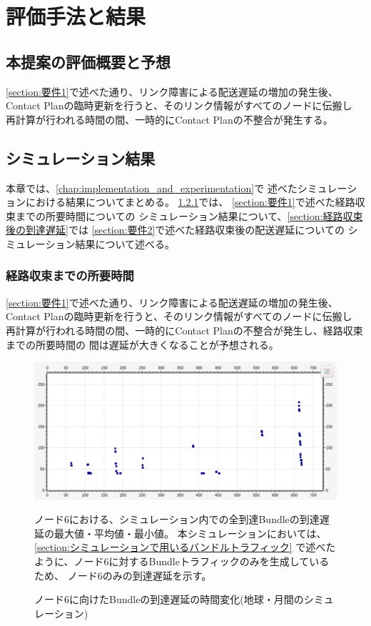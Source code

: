 \chapter{評価手法と結果}
\label{chap:evaluation}
\section{本提案の評価概要と予想}
\ref{section:要件1}で述べた通り、リンク障害による配送遅延の増加の発生後、
Contact Planの臨時更新を行うと、そのリンク情報がすべてのノードに伝搬し
再計算が行われる時間の間、一時的にContact Planの不整合が発生する。

\section{シミュレーション結果}
本章では、\ref{chap:implementation_and_experimentation}で
述べたシミュレーションにおける結果についてまとめる。
\ref{section:経路収束までの所要時間}では、
\ref{section:要件1}で述べた経路収束までの所要時間についての
シミュレーション結果について、\ref{section:経路収束後の到達遅延}では
\ref{section:要件2}で述べた経路収束後の配送遅延についての
シミュレーション結果について述べる。


\subsection{経路収束までの所要時間}
\label{section:経路収束までの所要時間}
\ref{section:要件1}で述べた通り、リンク障害による配送遅延の増加の発生後、
Contact Planの臨時更新を行うと、そのリンク情報がすべてのノードに伝搬し
再計算が行われる時間の間、一時的にContact Planの不整合が発生し、経路収束までの所要時間の
間は遅延が大きくなることが予想される。
\begin{figure}[tbh]
    \centering
    \includegraphics[width=0.7\textheight]{img/thesis_sample_delay_time.pdf}
    \caption{ノード6に向けたBundleの到達遅延の時間変化(地球・月間のシミュレーション)}
    \label{fig:delay_time_variation_earth_moon}
    \begin{minipage}{\textwidth}
        \raggedright
        \vspace{3mm}
        ノード6における、シミュレーション内での全到達Bundleの到達遅延の最大値・平均値・最小値。
        本シミュレーションにおいては、\ref{section:シミュレーションで用いるバンドルトラフィック}
        で述べたように、ノード6に対するBundleトラフィックのみを生成しているため、
        ノード6のみの到達遅延を示す。
    \end{minipage}
\end{figure}

